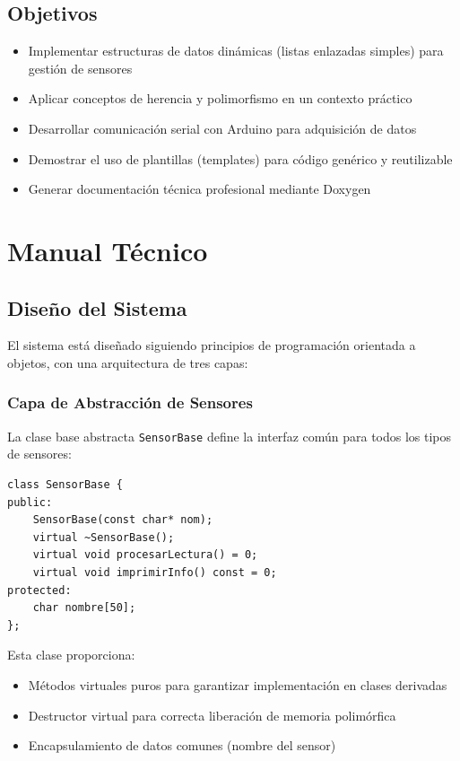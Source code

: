 \documentclass[conference]{IEEEtran}
\begin{document}
\subsection{Objetivos}

\begin{itemize}
    \item Implementar estructuras de datos dinámicas (listas enlazadas simples) para gestión de sensores
    \item Aplicar conceptos de herencia y polimorfismo en un contexto práctico
    \item Desarrollar comunicación serial con Arduino para adquisición de datos
    \item Demostrar el uso de plantillas (templates) para código genérico y reutilizable
    \item Generar documentación técnica profesional mediante Doxygen
\end{itemize}

\section{Manual Técnico}

\subsection{Diseño del Sistema}

El sistema está diseñado siguiendo principios de programación orientada a objetos, con una arquitectura de tres capas:

\subsubsection{Capa de Abstracción de Sensores}

La clase base abstracta \texttt{SensorBase} define la interfaz común para todos los tipos de sensores:

\vspace{0.3cm}
\begin{lstlisting}
class SensorBase {
public:
    SensorBase(const char* nom);
    virtual ~SensorBase();
    virtual void procesarLectura() = 0;
    virtual void imprimirInfo() const = 0;
protected:
    char nombre[50];
};
\end{lstlisting}
\vspace{0.2cm}

Esta clase proporciona:
\begin{itemize}
    \item Métodos virtuales puros para garantizar implementación en clases derivadas
    \item Destructor virtual para correcta liberación de memoria polimórfica
    \item Encapsulamiento de datos comunes (nombre del sensor)
\end{itemize}
\end{document}
